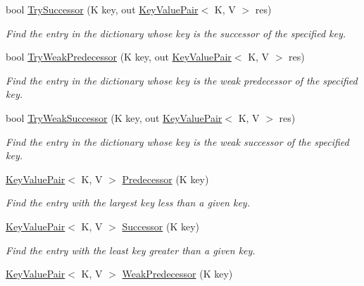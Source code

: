 \begin{DoxyCompactItemize}
bool \hyperlink{interface_c5_1_1_i_sorted_dictionary_ac1448e6b319536dfb28e8b1672a5040f}{Try\+Successor} (K key, out \hyperlink{struct_c5_1_1_key_value_pair}{Key\+Value\+Pair}$<$ K, V $>$ res)
\begin{DoxyCompactList}\small\item\em Find the entry in the dictionary whose key is the successor of the specified key. \end{DoxyCompactList}\item 
bool \hyperlink{interface_c5_1_1_i_sorted_dictionary_a2a0e18f33ee744e70c5efd2e737a0083}{Try\+Weak\+Predecessor} (K key, out \hyperlink{struct_c5_1_1_key_value_pair}{Key\+Value\+Pair}$<$ K, V $>$ res)
\begin{DoxyCompactList}\small\item\em Find the entry in the dictionary whose key is the weak predecessor of the specified key. \end{DoxyCompactList}\item 
bool \hyperlink{interface_c5_1_1_i_sorted_dictionary_aae858ab66e83568973c0effdfda6841b}{Try\+Weak\+Successor} (K key, out \hyperlink{struct_c5_1_1_key_value_pair}{Key\+Value\+Pair}$<$ K, V $>$ res)
\begin{DoxyCompactList}\small\item\em Find the entry in the dictionary whose key is the weak successor of the specified key. \end{DoxyCompactList}\item 
\hyperlink{struct_c5_1_1_key_value_pair}{Key\+Value\+Pair}$<$ K, V $>$ \hyperlink{interface_c5_1_1_i_sorted_dictionary_ab64ecd53de02894b0d64939911fce071}{Predecessor} (K key)
\begin{DoxyCompactList}\small\item\em Find the entry with the largest key less than a given key. \end{DoxyCompactList}\item 
\hyperlink{struct_c5_1_1_key_value_pair}{Key\+Value\+Pair}$<$ K, V $>$ \hyperlink{interface_c5_1_1_i_sorted_dictionary_af8c2971bff5e52c471f19764d9d90312}{Successor} (K key)
\begin{DoxyCompactList}\small\item\em Find the entry with the least key greater than a given key. \end{DoxyCompactList}\item 
\hyperlink{struct_c5_1_1_key_value_pair}{Key\+Value\+Pair}$<$ K, V $>$ \hyperlink{interface_c5_1_1_i_sorted_dictionary_ad090cecc22bc2e5a09fe3b0ef7afd5de}{Weak\+Predecessor} (K key)

\end{DoxyCompactItemize}
